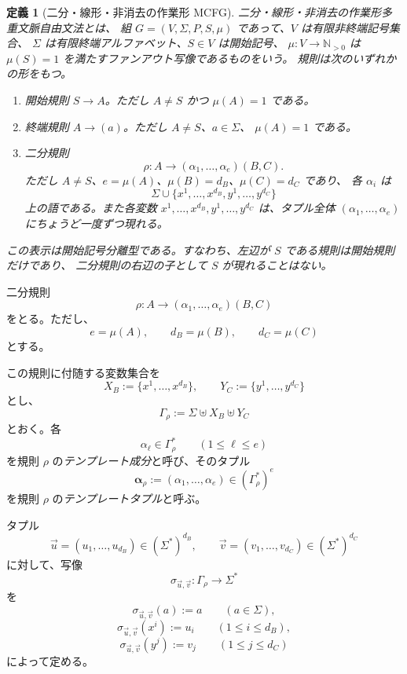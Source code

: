 \documentclass[11pt,a4paper]{ltjsarticle}
\newtheorem{definition}[theorem]{定義}
\theoremstyle{remark}
\newcommand{\tuple}[1]{\vec{#1}}
\begin{document}
\begin{definition}[二分・線形・非消去の作業形 MCFG]
\label{def:working-mcfg}
\emph{二分・線形・非消去の作業形多重文脈自由文法}とは、
組 \(G=(V,\Sigma,P,S,\mu)\) であって、\(V\) は有限非終端記号集合、
\(\Sigma\) は有限終端アルファベット、\(S\in V\) は開始記号、
\(\mu\colon V\to\mathbb N_{>0}\) は \(\mu(S)=1\) を満たすファンアウト写像であるものをいう。
規則は次のいずれかの形をもつ。
\begin{enumerate}[label=(\roman*),leftmargin=*]
\item 開始規則 \(S\to A\)。ただし \(A\ne S\) かつ \(\mu(A)=1\) である。
\item 終端規則 \(A\to(a)\)。ただし \(A\ne S\)、\(a\in\Sigma\)、
\(\mu(A)=1\) である。
\item 二分規則
\[
  \rho\colon A\to(\alpha_1,\ldots,\alpha_e)(B,C).
\]
ただし \(A\ne S\)、\(e=\mu(A)\)、\(\mu(B)=d_B\)、\(\mu(C)=d_C\) であり、
各 \(\alpha_i\) は
\[
  \Sigma\cup\{x^1,\ldots,x^{d_B},y^1,\ldots,y^{d_C}\}
\]
上の語である。また各変数
\(x^1,\ldots,x^{d_B},y^1,\ldots,y^{d_C}\) は、タプル全体
\((\alpha_1,\ldots,\alpha_e)\) にちょうど一度ずつ現れる。
\end{enumerate}
この表示は\emph{開始記号分離型}である。すなわち、左辺が \(S\) である規則は開始規則だけであり、
二分規則の右辺の子として \(S\) が現れることはない。
\end{definition}

二分規則
\[
  \rho\colon
  A\to(\alpha_1,\ldots,\alpha_e)(B,C)
\]
をとる。ただし、
\[
  e=\mu(A),\qquad
  d_B=\mu(B),\qquad
  d_C=\mu(C)
\]
とする。

この規則に付随する変数集合を
\[
  X_B:=\{x^1,\ldots,x^{d_B}\},
  \qquad
  Y_C:=\{y^1,\ldots,y^{d_C}\}
\]
とし、
\[
  \Gamma_\rho
  :=
  \Sigma\uplus X_B\uplus Y_C
\]
とおく。各
\[
  \alpha_\ell\in\Gamma_\rho^*
  \qquad (1\le \ell\le e)
\]
を規則 \(\rho\) の\emph{テンプレート成分}と呼び、そのタプル
\[
  \boldsymbol{\alpha}_\rho
  :=
  (\alpha_1,\ldots,\alpha_e)
  \in(\Gamma_\rho^*)^e
\]
を規則 \(\rho\) の\emph{テンプレートタプル}と呼ぶ。

タプル
\[
  \tuple u=(u_1,\ldots,u_{d_B})
  \in(\Sigma^*)^{d_B},
  \qquad
  \tuple v=(v_1,\ldots,v_{d_C})
  \in(\Sigma^*)^{d_C}
\]
に対して、写像
\[
  \sigma_{\tuple u,\tuple v}\colon
  \Gamma_\rho\to\Sigma^*
\]
を
\[
  \sigma_{\tuple u,\tuple v}(a):=a
  \qquad (a\in\Sigma),
\]
\[
  \sigma_{\tuple u,\tuple v}(x^i):=u_i
  \qquad (1\le i\le d_B),
\]
\[
  \sigma_{\tuple u,\tuple v}(y^j):=v_j
  \qquad (1\le j\le d_C)
\]
によって定める。
\end{document}

